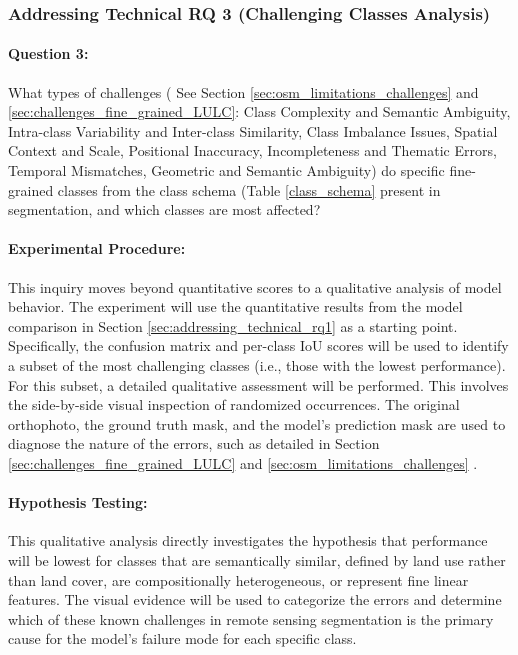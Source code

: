 \documentclass{report}
\begin{document}
\subsubsection{Addressing Technical RQ 3 (Challenging Classes Analysis)}
\label{sec:addressing_technical_rq3}
\paragraph{Question 3:} What types of challenges ( See Section \ref{sec:osm_limitations_challenges} and \ref{sec:challenges_fine_grained_LULC}: Class Complexity and Semantic Ambiguity, Intra-class Variability and Inter-class Similarity, Class Imbalance Issues, Spatial Context and Scale, Positional Inaccuracy, Incompleteness and Thematic Errors, Temporal Mismatches, Geometric and Semantic Ambiguity) do specific fine-grained classes from the class schema (Table \ref{class_schema} present in segmentation, and which classes are most affected?
\paragraph{Experimental Procedure:} This inquiry moves beyond quantitative scores to a qualitative analysis of model behavior. The experiment will use the quantitative results from the model comparison in Section \ref{sec:addressing_technical_rq1} as a starting point. Specifically, the confusion matrix and per-class IoU scores will be used to identify a subset of the most challenging classes (i.e., those with the lowest performance). For this subset, a detailed qualitative assessment will be performed. This involves the side-by-side visual inspection of randomized occurrences. The original orthophoto, the ground truth mask, and the model's prediction mask are used to diagnose the nature of the errors, such as detailed in Section \ref{sec:challenges_fine_grained_LULC} and \ref{sec:osm_limitations_challenges} \parencites [p.~13f.]{SertelEtAlLandUseLandCoverMappingUsingDeepLearningBasedSegmentationApproachesVHRWorldview3Images2022} [p.~339]{CostaEtAlSupervisedmethodsimagesegmentationaccuracyassessmentlandcovermapping2018}.
\paragraph{Hypothesis Testing:} This qualitative analysis directly investigates the hypothesis that performance will be lowest for classes that are semantically similar, defined by land use rather than land cover, are compositionally heterogeneous, or represent fine linear features. The visual evidence will be used to categorize the errors and determine which of these known challenges in remote sensing segmentation is the primary cause for the model's failure mode for each specific class.
\end{document}
